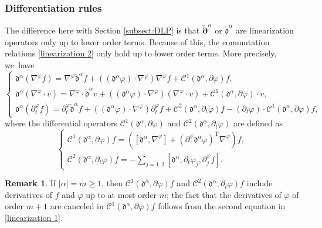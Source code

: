 \documentclass[JEP,XML,SOM,Unicode,NoFloatCountersInSection,published]{cedram}
\newcommand{\dt}{\partial_t}
\newcommand{\cpalpha}{\check{\bm{\partial}}^{\alpha} }
\newcommand{\cmfalpha}{\check{\mathfrak{d}}^{\alpha}}
\theoremstyle{definition}
\newtheorem{remark}[theorem]{Remark}
\begin{document}
\subsubsection{Differentiation rules} \label{sectdiffrules}
The difference here with Section \ref{subsect:DLP} is that $\cpalpha$ or $\cmfalpha$ are linearization operators only up to lower order terms.
Because of this, the commutation relations \eqref{linearization 2} only hold up to lower order terms. More precisely, we~have
\begin{equation}\label{comrules2}
\begin{cases}
\mathfrak{d}^\alpha(\nabla^\varphi f)
= \nabla^\varphi \cmfalpha f \!+\! ((\mathfrak{d}^\alpha\varphi)\cdot\nabla^\varphi)\nabla^\varphi f \!+\!{\mathcal C}^1(\mathfrak{d}^\alpha,\partial \varphi) f, \\
\mathfrak{d}^\alpha(\nabla^\varphi\cdot v)
= \nabla^\varphi\cdot \cmfalpha v
\!+\! ((\mathfrak{d}^\alpha\varphi)\cdot\nabla^\varphi)(\nabla^\varphi\cdot v) \!+\!{\mathcal C}^1(\mathfrak{d}^\alpha,\partial \varphi)\cdot v, \\
\mathfrak{d}^\alpha(\dt^\varphi f)
= \dt^\varphi \cmfalpha f\!+\! ((\mathfrak{d}^\alpha\varphi)\cdot\nabla^\varphi)\dt^\varphi f \!+\!
{\mathcal C}^2(\mathfrak{d}^\alpha,\dt \varphi) f
- (\dt\varphi)\cdot {\mathcal C}^1(\mathfrak{d}^\alpha,\partial \varphi)f,
\end{cases}
\end{equation}
where the differential operators ${\mathcal C}^1(\mathfrak{d}^\alpha,\partial \varphi)$ and ${\mathcal C}^2(\mathfrak{d}^\alpha,\dt \varphi)$ are defined as
\begin{equation}\label{defcomC}
\begin{cases}
{\mathcal C}^1(\mathfrak{d}^\alpha,\partial \varphi) f
= ([\mathfrak{d}^\alpha,\nabla^\varphi]+(\partial^\varphi\mathfrak{d}^\alpha\varphi)^\mathrm{T}\nabla^\varphi)f, \\
{\mathcal C}^2(\mathfrak{d}^\alpha,\dt \varphi) f
= - \textstyle\sum_{j=1,2}[\mathfrak{d}^\alpha; \dt\varphi_j,\partial_j^\varphi f].
\end{cases}
\end{equation}

\begin{remark}\label{remC1C2}
If $|\alpha|=m\geq1$, then ${\mathcal C}^1(\mathfrak{d}^\alpha,\partial \varphi) f$
and ${\mathcal C}^2(\mathfrak{d}^\alpha,\dt \varphi) f$ include derivatives of $f$ and $\varphi$ up to at most order $m$;
the fact that the derivatives of $\varphi$ of order $m+1$ are canceled in ${\mathcal C}^1(\mathfrak{d}^\alpha,\partial \varphi) f$
follows from the second equation in \eqref{linearization 1}.
\end{remark}
\end{document}
